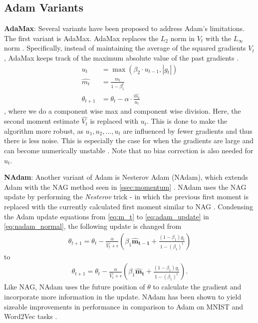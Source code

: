 \subsection{Adam Variants}
\label{ssec:adam_variants}

\textbf{AdaMax}: Several variants have been proposed to address Adam's limitations. The first variant is AdaMax. AdaMax replaces the $L_2$ norm in $V_t$ with the $L_{\infty}$ norm \citep{kingma2014adam}. Specifically, instead of maintaining the average of the squared gradients $V_t$, AdaMax keeps track of the maximum absolute value of the past gradients \citep{kingma2014adam}.
\begin{align}
    u_t &= \max(\beta_2 \cdot u_{t-1}, |g_t|) \\ 
    \hat{m_t} &= \frac{m_t}{1 - \beta_1^t} \\
    \theta_{t+1} &= \theta_t - \alpha \cdot \frac{\hat{m_t}}{u_t}
\end{align}, 
where we do a component wise max and component wise division. Here, the second moment estimate $\hat{V_t}$ is replaced with $u_t$. This is done to make the algorithm more robust, as $u_1, u_2, \dots, u_t$ are influenced by fewer gradients and thus there is less noise. This is especially the case for when the gradients are large and can become numerically unstable \citep{kingma2014adam}. Note that no bias correction is also needed for $u_t$.

\textbf{NAdam}: Another variant of Adam is Nesterov Adam (NAdam), which extends Adam with the NAG method seen in \cref{ssec:momentum} \citep{dozat2016nadam}. NAdam uses the NAG update by performing the \textit{Nesterov} trick - in which the previous first moment is replaced with the currently calculated first moment similar to NAG \citep{nesterov1983method,dozat2016nadam}. Condensing the Adam update equations from \cref{eq:m_t} to \cref{eq:adam_update} in \cref{eq:nadam_normal}, the following update is changed from 
\begin{align}
    \theta_{t+1} = \theta_t - \frac{\alpha}{{\hat{V_t}} + \epsilon} \left( \beta_1 \mathbf{\hat{m}_{t-1}} + \frac{(1 - \beta_1)g_t}{1 - (\beta_1)^t} \right) \label{eq:nadam_normal}
\end{align}
to 
\begin{align}
    \theta_{t+1} = \theta_t - \frac{\alpha}{{\hat{V_t}} + \epsilon} \left( \beta_1 \mathbf{\hat{m}_{t}} + \frac{(1 - \beta_1)g_t}{1 - (\beta_1)^t} \right).
\end{align}
Like NAG, NAdam uses the future position of $\theta$ to calculate the gradient and incorporate more information in the update. NAdam has been shown to yield sizeable improvements in performance in comparison to Adam on MNIST and Word2Vec tasks \citep{dozat2016nadam}.

